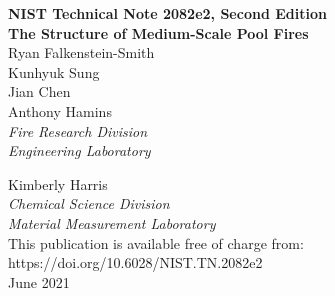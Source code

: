 \documentclass[12pt]{article}
\newcommand{\pubnumber}{2082e2, Second Edition}
\newcommand{\DOI}{https://doi.org/10.6028/NIST.TN.2082e2}
\newcommand{\monthyear}{June 2021}
\begin{document}
\begin{titlepage}
\begin{flushright}
\LARGE{\textbf{NIST Technical Note \pubnumber}}\\
\vfill
\Huge{\textbf{The Structure of Medium-Scale Pool Fires}}\\
\vfill
\normalsize Ryan Falkenstein-Smith\\
Kunhyuk Sung\\
Jian Chen\\
Anthony Hamins\\
\large
\textit{Fire Research Division}\\
\textit{Engineering Laboratory}\\
\vspace{12pt}
\vfill

\normalsize Kimberly Harris\\
\large
\textit{Chemical Science Division}\\
\textit{Material Measurement Laboratory}\\
\vspace{12pt}
\vfill
\normalsize This publication is available free of charge from:\\
\DOI\\
\vfill
\normalsize \monthyear
\vfill


\end{flushright}
\end{titlepage}
\end{document}
